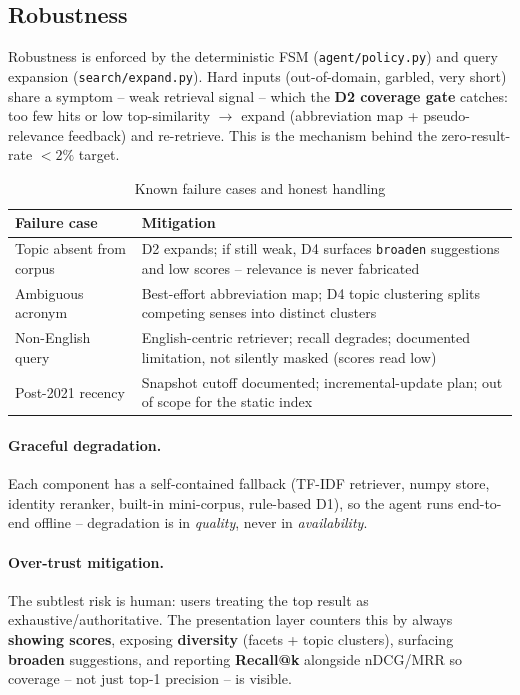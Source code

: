 \documentclass[12pt,a4paper]{article}
\begin{document}
\subsection{Robustness}

Robustness is enforced by the deterministic FSM (\texttt{agent/policy.py}) and query expansion (\texttt{search/expand.py}). Hard inputs (out-of-domain, garbled, very short) share a symptom -- weak retrieval signal -- which the \textbf{D2 coverage gate} catches: too few hits or low top-similarity $\rightarrow$ expand (abbreviation map + pseudo-relevance feedback) and re-retrieve. This is the mechanism behind the zero-result-rate $<2\%$ target.

\begin{table}[H]
\centering
\caption{Known failure cases and honest handling}
\small
\begin{tabularx}{\linewidth}{@{} l L @{}}
\toprule
\textbf{Failure case} & \textbf{Mitigation} \\
\midrule
Topic absent from corpus & D2 expands; if still weak, D4 surfaces \texttt{broaden} suggestions and low scores -- relevance is never fabricated \\
Ambiguous acronym & Best-effort abbreviation map; D4 topic clustering splits competing senses into distinct clusters \\
Non-English query & English-centric retriever; recall degrades; documented limitation, not silently masked (scores read low) \\
Post-2021 recency & Snapshot cutoff documented; incremental-update plan; out of scope for the static index \\
\bottomrule
\end{tabularx}
\end{table}

\paragraph{Graceful degradation.} Each component has a self-contained fallback (TF-IDF retriever, numpy store, identity reranker, built-in mini-corpus, rule-based D1), so the agent runs end-to-end offline -- degradation is in \emph{quality}, never in \emph{availability}.

\paragraph{Over-trust mitigation.} The subtlest risk is human: users treating the top result as exhaustive/authoritative. The presentation layer counters this by always \textbf{showing scores}, exposing \textbf{diversity} (facets + topic clusters), surfacing \textbf{broaden} suggestions, and reporting \textbf{Recall@k} alongside nDCG/MRR so coverage -- not just top-1 precision -- is visible.
\end{document}
